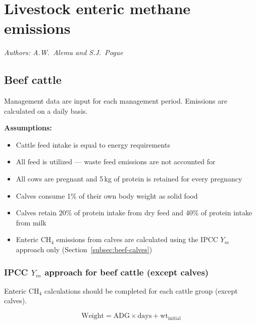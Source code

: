 \chapter{Livestock enteric methane emissions}
\label{ch:enteric}

\textit{Authors: A.W.\ Alemu and S.J.\ Pogue}

\section{Beef cattle}
\label{sec:beef}

Management data are input for each management period. Emissions are calculated
on a daily basis.

\noindent\textbf{Assumptions:}
\begin{itemize}[leftmargin=1.5em]
    \item Cattle feed intake is equal to energy requirements
    \item All feed is utilized --- waste feed emissions are not accounted for
    \item All cows are pregnant and 5\,kg of protein is retained for every pregnancy
    \item Calves consume 1\% of their own body weight as solid food
    \item Calves retain 20\% of protein intake from dry feed and 40\% of protein
          intake from milk
    \item Enteric CH$_4$ emissions from calves are calculated using the IPCC $Y_m$
          approach only (Section~\ref{subsec:beef-calves})
\end{itemize}

\subsection{IPCC \texorpdfstring{$Y_m$}{Ym} approach for beef cattle (except calves)}
\label{subsec:beef-ym}

Enteric CH$_4$ calculations should be completed for each cattle group (except calves).

\begin{equation}
    \mathrm{Weight} = \mathrm{ADG} \times \mathrm{days} + \mathrm{wt}_{\mathrm{initial}}
    \tag{Eq.\ 3.1.1.1}
\end{equation}

